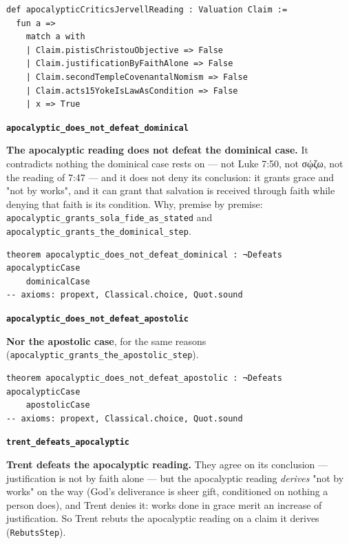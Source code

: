 \documentclass[11pt]{article}
\begin{document}
{\small\begin{verbatim}
def apocalypticCriticsJervellReading : Valuation Claim :=
  fun a =>
    match a with
    | Claim.pistisChristouObjective => False
    | Claim.justificationByFaithAlone => False
    | Claim.secondTempleCovenantalNomism => False
    | Claim.acts15YokeIsLawAsCondition => False
    | x => True
\end{verbatim}}
\par\medskip\noindent\textbf{\texttt{apocalyptic\_\allowbreak{}does\_\allowbreak{}not\_\allowbreak{}defeat\_\allowbreak{}dominical}}\par\nobreak\noindent
\textbf{The apocalyptic reading does not defeat the dominical case.} It contradicts nothing the dominical case rests on — not Luke 7:50, not σῴζω, not the reading of 7:47 — and it does not deny its conclusion: it grants grace and "not by works", and it can grant that salvation is received through faith while denying that faith is its condition. Why, premise by premise: \texttt{apocalyptic\_\allowbreak{}grants\_\allowbreak{}sola\_\allowbreak{}fide\_\allowbreak{}as\_\allowbreak{}stated} and \texttt{apocalyptic\_\allowbreak{}grants\_\allowbreak{}the\_\allowbreak{}dominical\_\allowbreak{}step}.

{\small\begin{verbatim}
theorem apocalyptic_does_not_defeat_dominical : ¬Defeats apocalypticCase
    dominicalCase
-- axioms: propext, Classical.choice, Quot.sound
\end{verbatim}}
\par\medskip\noindent\textbf{\texttt{apocalyptic\_\allowbreak{}does\_\allowbreak{}not\_\allowbreak{}defeat\_\allowbreak{}apostolic}}\par\nobreak\noindent
\textbf{Nor the apostolic case}, for the same reasons (\texttt{apocalyptic\_\allowbreak{}grants\_\allowbreak{}the\_\allowbreak{}apostolic\_\allowbreak{}step}).

{\small\begin{verbatim}
theorem apocalyptic_does_not_defeat_apostolic : ¬Defeats apocalypticCase
    apostolicCase
-- axioms: propext, Classical.choice, Quot.sound
\end{verbatim}}
\par\medskip\noindent\textbf{\texttt{trent\_\allowbreak{}defeats\_\allowbreak{}apocalyptic}}\par\nobreak\noindent
\textbf{Trent defeats the apocalyptic reading.} They agree on its conclusion — justification is not by faith alone — but the apocalyptic reading \emph{derives} "not by works" on the way (God's deliverance is sheer gift, conditioned on nothing a person does), and Trent denies it: works done in grace merit an increase of justification. So Trent rebuts the apocalyptic reading on a claim it derives (\texttt{Rebuts\allowbreak{}Step}).
\end{document}
